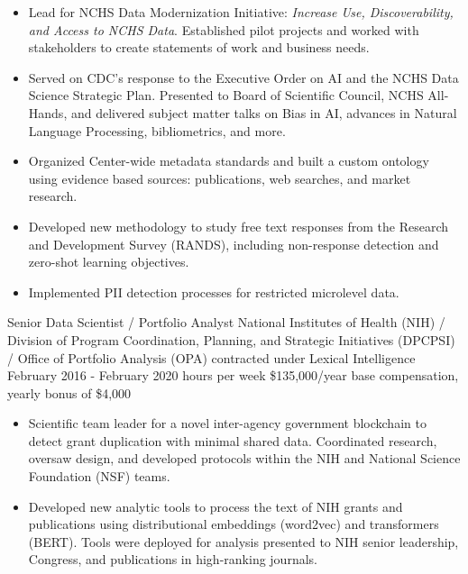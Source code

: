 \documentclass[]{scrartcl}
\begin{document}
\begin{cleanCV}
{\begin{itemize}
   \item Lead for NCHS Data Modernization Initiative: \emph{Increase Use, Discoverability, and Access to NCHS Data}. Established pilot projects and worked with stakeholders to create statements of work and business needs.
   \item Served on CDC's response to the Executive Order on AI and the NCHS Data Science Strategic Plan. Presented to Board of Scientific Council, NCHS All-Hands, and delivered subject matter talks on Bias in AI, advances in Natural Language Processing, bibliometrics, and more.
   \item Organized Center-wide metadata standards and built a custom ontology using evidence based sources: publications, web searches, and market research.
   \item Developed new methodology to study free text responses from the Research and Development Survey (RANDS), including non-response detection and zero-shot learning objectives.
   \item Implemented PII detection processes for restricted microlevel data.
  \end{itemize}
}
  
  \WorkExperience
{}
{Senior Data Scientist / Portfolio Analyst}
{
  \newline National Institutes of Health (NIH) / Division of Program Coordination, Planning, and Strategic Initiatives (DPCPSI) / Office of Portfolio Analysis (OPA) contracted under Lexical Intelligence
  \newline February 2016 - February 2020
   hours per week
  \newline \$135,000/year base compensation, yearly bonus of \$4,000
}
{
  \vspace{-0.25em}
  \begin{itemize}
    
    \item Scientific team leader for a novel inter-agency government blockchain to detect grant duplication with minimal shared data. Coordinated research, oversaw design, and developed protocols within the NIH and National Science Foundation (NSF) teams.

    \item Developed new analytic tools to process the text of NIH grants and publications using distributional embeddings (word2vec) and transformers (BERT). Tools were deployed for analysis presented to NIH senior leadership, Congress, and publications in high-ranking journals.


\end{itemize}}
\end{cleanCV}
\end{document}
